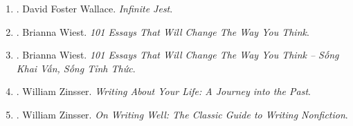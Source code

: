 \documentclass{article}
\begin{document}
\begin{enumerate}
	\item \cite{Wallace_jest}. David Foster Wallace. {\it Infinite Jest}.\hfill{\sf[reading]}
	
	\item \cite{Wiest_101_essays}. {\sc Brianna Wiest}. {\it 101 Essays That Will Change The Way You Think}.
	
	\item \cite{Wiest_101_essays_VN}. {\sc Brianna Wiest}. {\it 101 Essays That Will Change The Way You Think -- Sống Khai Vấn, Sống Tỉnh Thức}.\hfill{\sf[done]}
	
	\item \cite{Zinsser2005}. William Zinsser. {\it Writing About Your Life: A Journey into the Past}.
	
	\item \cite{Zinsser2016}. William Zinsser. {\it On Writing Well: The Classic Guide to Writing Nonfiction}.\hfill{\sf[reading]}
\end{enumerate}

\end{document}
